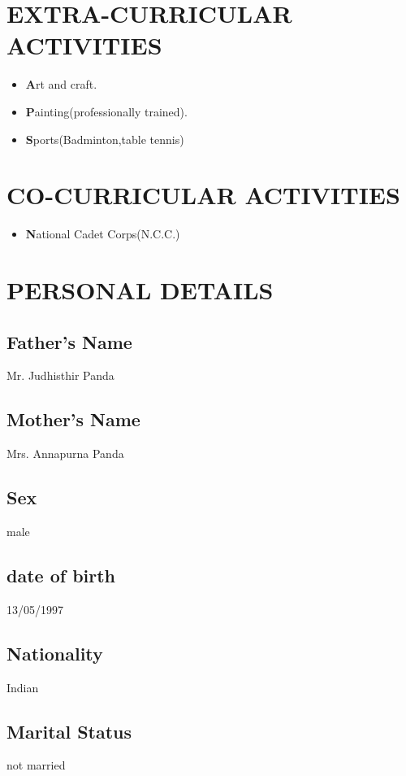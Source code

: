 \documentclass{article}
\begin{document}
\section{EXTRA-CURRICULAR ACTIVITIES}
\begin{itemize}
 \item \textbf Art and craft.
\end{itemize}
\begin{itemize}
 \item \textbf Painting(professionally trained).
\end{itemize}
\begin{itemize}
 \item \textbf Sports(Badminton,table tennis)
\end{itemize}

\section{CO-CURRICULAR ACTIVITIES}
\begin{itemize}
 \item \textbf National Cadet Corps(N.C.C.)
\end{itemize}
\section{PERSONAL DETAILS}
\subsection{Father's Name}
Mr. Judhisthir Panda
\subsection{Mother's Name}
Mrs. Annapurna Panda
\subsection{Sex}
male
\subsection{date of birth}
13/05/1997
\subsection{Nationality}
Indian
\subsection{Marital Status}
not married
\end{document}
